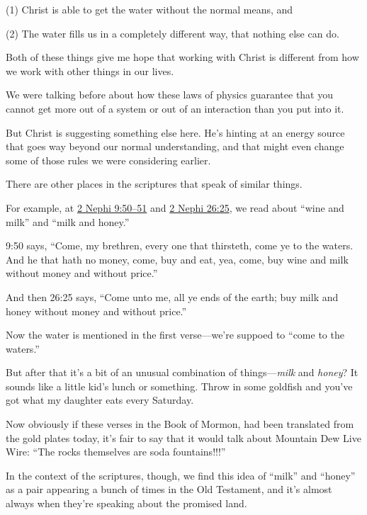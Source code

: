 \begin{compactitem}
\begin{compactitem}
\begin{compactitem}
							\item (1) Christ is able to get the water without the normal means, and 
							\item (2) The water fills us in a completely different way, that nothing else can do.
							\item Both of these things give me hope that working with Christ is different from how we work with other things in our lives. 
							\item We were talking before about how these laws of physics guarantee that you cannot get more out of a system or out of an interaction than you put into it.
							\item But Christ is suggesting something else here. He's hinting at an energy source that goes way beyond our normal understanding, and that might even change some of those rules we were considering earlier.
						\end{compactitem}
					\item There are other places in the scriptures that speak of similar things.
					\item For example, at \hyperref[2NEPHI-9-50]{2 Nephi 9:50--51} and \hyperref[2NEPHI-26-25]{2 Nephi 26:25}, we read about ``wine and milk'' and ``milk and honey.''
						\begin{compactitem}
							\item 9:50 says, ``Come, my brethren, every one that thirsteth, come ye to the waters. And he that hath no money, come, buy and eat, yea, come, buy wine and milk without money and without price.''
							\item And then 26:25 says, ``Come unto me, all ye ends of the earth; buy milk and honey without money and without price.''
							\item Now the water is mentioned in the first verse---we're suppoed to ``come to the waters.''
							\item But after that it's a bit of an unusual combination of things---\textit{milk} and \textit{honey}? It sounds like a little kid's lunch or something. Throw in some goldfish and you've got what my daughter eats every Saturday.
							\item Now obviously if these verses in the Book of Mormon, had been translated from the gold plates today, it's fair to say that it would talk about Mountain Dew Live Wire: ``The rocks themselves are soda fountains!!!'' 
							\item In the context of the scriptures, though, we find this idea of ``milk'' and ``honey'' as a pair appearing a bunch of times in the Old Testament, and it's almost always when they're speaking about the promised land.

\end{compactitem}
\end{compactitem}
\end{compactitem}
